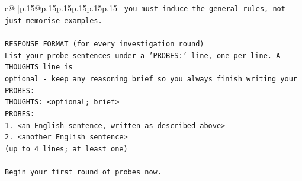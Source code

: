 \documentclass{article}
\begin{document}
{\begin{supertabular}{c@{$\;$}|p{.15\linewidth}@{}p{.15\linewidth}p{.15\linewidth}p{.15\linewidth}p{.15\linewidth}p{.15\linewidth}}
{{{\texttt{   you must induce the general rules, not just memorise examples.} \\
\\ 
\texttt{RESPONSE FORMAT (for every investigation round)} \\
\texttt{List your probe sentences under a 'PROBES:' line, one per line. A THOUGHTS line is} \\
\texttt{optional {-} keep any reasoning brief so you always finish writing your PROBES:} \\
\texttt{THOUGHTS: <optional; brief>} \\
\texttt{PROBES:} \\
\texttt{1. <an English sentence, written as described above>} \\
\texttt{2. <another English sentence>} \\
\texttt{(up to 4 lines; at least one)} \\
\\ 
\texttt{Begin your first round of probes now.} \\
            }
        }
    }
     \\ \\


\end{supertabular}}
\end{document}
